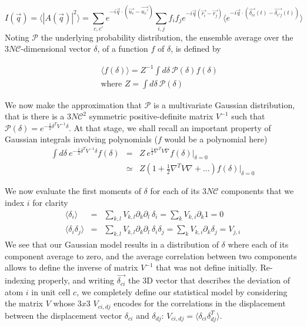 \documentclass{article}
\begin{document}
\begin{equation}
I(\vec{q}) = \langle |A(\vec{q})|^{2} \rangle = \sum\limits_{c,c'} e^{-i \vec{q} \cdot (\vec{u_c} - \vec{u_c'})} \sum\limits_{i,j} f_i f_j e^{-i \vec{q} (\vec{r_i} - \vec{r_j})} \langle e^{-i \vec{q} \cdot (\vec{\delta_{ci}}(t) - \vec{\delta_{c'j}}(t))} \rangle
\end{equation}
Noting $\mathcal{P}$ the underlying probability distribution, the ensemble average over the $3N\mathcal{C}$-dimensional vector $\delta$, of a function $f$ of $\delta$, is defined by

\begin{eqnarray}
	&&\langle f(\delta) \rangle = Z^{-1} \int d\delta\ \mathcal{P}(\delta) f(\delta) \\\nonumber
	&&\text{where } Z=\int d\delta\ \mathcal{P}(\delta)
\end{eqnarray}

We now make the approximation that $\mathcal{P}$ is a multivariate Gaussian distribution, that is there is a $3N\mathcal{C}^{2}$ symmetric positive-definite matrix $V^{-1}$ such that $\mathcal{P}(\delta)=e^{-\frac{1}{2}\delta^{T}V^{-1}\delta}$. At that stage, we shall recall an important property of Gaussian integrals involving polynomials ($f$ would be a polynomial here)
\begin{eqnarray}
\int d\delta\ e^{-\frac{1}{2}\delta^{T}V^{-1}\delta} f(\delta) &=& Z\  e^{\frac{1}{2}\nabla^{T}V\nabla}f(\delta)|_{\delta=0}\\\nonumber
&\simeq& Z(1+\frac{1}{2}\nabla^{T}V\nabla+...)f(\delta)|_{\delta=0}
\end{eqnarray}

We now evaluate the first moments of $\delta$ for each of its $3N\mathcal{C}$ components that we index $i$ for clarity
\begin{eqnarray}
\langle \delta_{i} \rangle &=& \sum_{k,l}V_{k,l}\partial_{k}\partial_{l}\ \delta_{i} = \sum_{k}V_{k,i}\partial_{k}1 = 0\\\nonumber
\langle \delta_{i}\delta_{j} \rangle &=& \sum_{k,l}V_{k,l}\partial_{k}\partial_{l}\ \delta_{i}\delta_{j} = \sum_{k}V_{k,i}\partial_{k}\delta_{j} = V_{j,i}
\end{eqnarray}
We see that our Gaussian model results in a distribution of $\delta$ where each of its component average to zero, and the average correlation between two components allows to define the inverse of matrix $V^{-1}$ that was not define initially. Re-indexing properly, and writing $\vec{\delta_{ci}}$ the 3D vector that describes the deviation of atom $i$ in unit cell $c$, we completely define our statistical model by considering the matrix $V$ whose $3x3$ $V_{ci,dj}$ encodes for the correlations in the displacement between the displacement vector $\delta_{ci}$ and $\delta_{dj}$: $V_{ci,dj}=\langle \delta_{ci}\delta_{dj}^{T}\rangle$.\\
\end{document}
